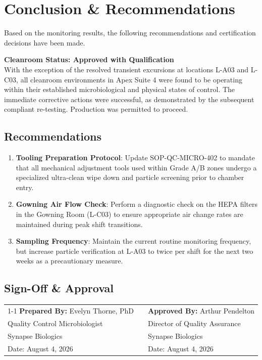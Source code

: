 \section{Conclusion \& Recommendations}
Based on the monitoring results, the following recommendations and certification decisions have been made.

\begin{verdictbox}
\textbf{Cleanroom Status: Approved with Qualification} \\
With the exception of the resolved transient excursions at locations L-A03 and L-C03, all cleanroom environments in Apex Suite 4 were found to be operating within their established microbiological and physical states of control. The immediate corrective actions were successful, as demonstrated by the subsequent compliant re-testing. Production was permitted to proceed.
\end{verdictbox}

\subsection{Recommendations}
\begin{enumerate}
  \item \textbf{Tooling Preparation Protocol}: Update SOP-QC-MICRO-402 to mandate that all mechanical adjustment tools used within Grade A/B zones undergo a specialized ultra-clean wipe down and particle screening prior to chamber entry.
  \item \textbf{Gowning Air Flow Check}: Perform a diagnostic check on the HEPA filters in the Gowning Room (L-C03) to ensure appropriate air change rates are maintained during peak shift transitions.
  \item \textbf{Sampling Frequency}: Maintain the current routine monitoring frequency, but increase particle verification at L-A03 to twice per shift for the next two weeks as a precautionary measure.
\end{enumerate}

\vspace{2.5em}

\subsection{Sign-Off \& Approval}
\begin{tabularx}{\textwidth}{X p{1cm} X}
  \cline{1-1} \cline{3-3}
  \textbf{Prepared By:} Evelyn Thorne, PhD & & \textbf{Approved By:} Arthur Pendelton \\
  Quality Control Microbiologist & & Director of Quality Assurance \\
  Synapse Biologics & & Synapse Biologics \\
  Date: August 4, 2026 & & Date: August 4, 2026 \\
\end{tabularx}

